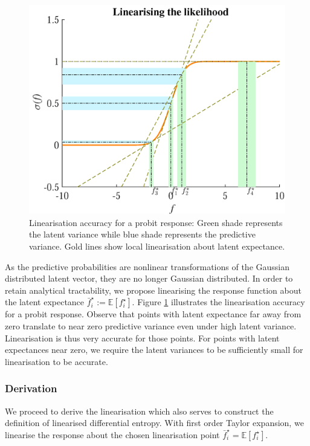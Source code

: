 \documentclass{article}
\begin{document}
		\begin{figure}[!htbp]
			\centering
				\includegraphics[width = \linewidth]{Figures/linearisation-eps-converted-to.png}
			\caption{Linearisation accuracy for a probit response: Green shade represents the latent variance while blue shade represents the predictive variance. Gold lines show local linearisation about latent expectance.}
			\label{Figure:Linearisation}
		\end{figure}
			
		As the predictive probabilities are nonlinear transformations of the Gaussian distributed latent vector, they are no longer Gaussian distributed. In order to retain analytical tractability, we propose linearising the response function about the latent expectance $\bar{f}^{\star}_{i} := \mathbb{E}[f^{\star}_{i}]$. Figure \ref{Figure:Linearisation} illustrates the linearisation accuracy for a probit response. Observe that points with latent expectance far away from zero translate to near zero predictive variance even under high latent variance. Linearisation is thus very accurate for those points. For points with latent expectances near zero, we require the latent variances to be sufficiently small for linearisation to be accurate.
		
		\subsubsection{Derivation}
		
			We proceed to derive the linearisation which also serves to construct the definition of linearised differential entropy. With first order Taylor expansion, we linearise the response about the chosen linearisation point $\bar{f}^{\star}_{i} = \mathbb{E}[f^{\star}_{i}]$.
			
\end{document}
